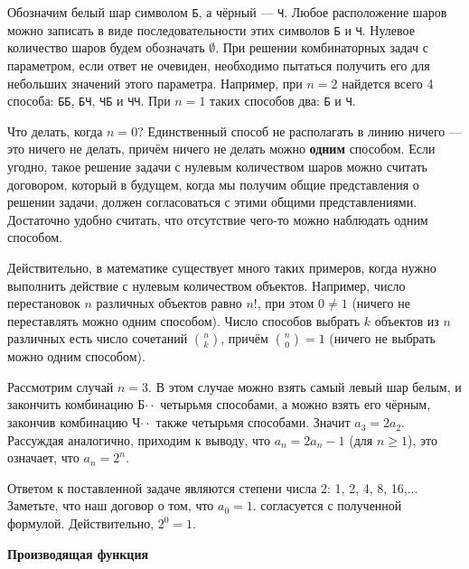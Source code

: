 \documentclass[12pt, letterpaper]{extarticle}
\begin{document}
Обозначим белый шар символом \texttt{Б}, а чёрный — \texttt{Ч}. Любое расположение шаров можно записать в виде последовательности этих символов \texttt{Б} и \texttt{Ч}. Нулевое количество шаров будем обозначать $\emptyset$. При решении комбинаторных задач с параметром, если ответ не очевиден, необходимо пытаться получить его для небольших значений этого параметра. Например, при $n=2$ найдется всего 4 способа: \texttt{Б}\texttt{Б}, \texttt{Б}\texttt{Ч}, \texttt{Ч}\texttt{Б} и \texttt{Ч}\texttt{Ч}. При $n=1$ таких способов два: \texttt{Б} и \texttt{Ч}.

Что делать, когда $n=0$? Единственный способ не располагать в линию ничего — это ничего не делать, причём ничего не делать можно \textbf{одним} способом. Если угодно, такое решение задачи с нулевым количеством шаров можно считать договором, который в будущем, когда мы получим общие представления о решении задачи, должен согласоваться с этими общими представлениями. Достаточно удобно считать, что отсутствие чего-то можно наблюдать одним способом.

\begin{footnotesize}
Действительно, в математике существует много таких примеров, когда нужно выполнить действие с нулевым количеством объектов. Например, число перестановок $n$ различных объектов равно $n!$, при этом $0\neq1$ (ничего не переставлять можно одним способом). Число способов выбрать $k$ объектов из $n$ различных есть число сочетаний $\binom{n}{k}$, причём $\binom{n}{0}=1$ (ничего не выбрать можно одним способом).
\end{footnotesize}

Рассмотрим случай $n=3$. В этом случае можно взять самый левый шар белым, и закончить комбинацию Б$\cdot\cdot$ четырьмя способами, а можно взять его чёрным, закончив комбинацию Ч$\cdot\cdot$ также четырьмя способами. Значит $a_3=2a_2$. Рассуждая аналогично, приходим к выводу, что $a_n=2a_n-1$ (для $n\geq1$), это означает, что $a_n=2^n$.

Ответом к поставленной задаче являются степени числа 2: 1, 2, 4, 8, 16,... Заметьте, что наш договор о том, что $a_0=1$. согласуется с полученной формулой. Действительно, $2^0=1$.

\textbf{Производящая функция}
\end{document}
